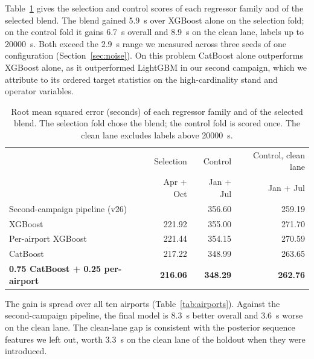 \documentclass[11pt,a4paper]{article}
\begin{document}
Table~\ref{tab:families} gives the selection and control scores of each
regressor family and of the selected blend. The blend gained \SI{5.9}{\second}
over XGBoost alone on the selection fold; on the control fold it gains
\SI{6.7}{\second} overall and \SI{8.9}{\second} on the clean lane, labels up to
\SI{20000}{\second}. Both exceed the \SI{2.9}{\second} range we measured
across three seeds of one configuration (Section~\ref{sec:noise}). On this
problem CatBoost alone outperforms XGBoost alone, as it outperformed LightGBM
in our second campaign, which we attribute to its ordered target statistics on the
high-cardinality stand and operator variables.

\begin{table}[t]
\centering
\caption{Root mean squared error (seconds) of each regressor family and of
the selected blend. The selection fold chose the blend; the control fold is
scored once. The clean lane excludes labels above \SI{20000}{\second}.}
\label{tab:families}
\begin{tabular}{lrrr}
\toprule
& Selection & Control & Control, clean lane \\
& Apr + Oct & Jan + Jul & Jan + Jul \\
\midrule
Second-campaign pipeline (v26) & & 356.60 & 259.19 \\
XGBoost & 221.92 & 355.00 & 271.70 \\
Per-airport XGBoost & 221.44 & 354.15 & 270.59 \\
CatBoost & 217.22 & 348.99 & 263.65 \\
\textbf{0.75 CatBoost + 0.25 per-airport} & \textbf{216.06} & \textbf{348.29} & \textbf{262.76} \\
\bottomrule
\end{tabular}
\end{table}

The gain is spread over all ten airports (Table~\ref{tab:airports}). Against
the second-campaign pipeline, the final model is \SI{8.3}{\second} better
overall and \SI{3.6}{\second} worse on the clean lane. The clean-lane gap is
consistent with the posterior sequence features we left out, worth
\SI{3.3}{\second} on the clean lane of the holdout when they were introduced.
\end{document}

